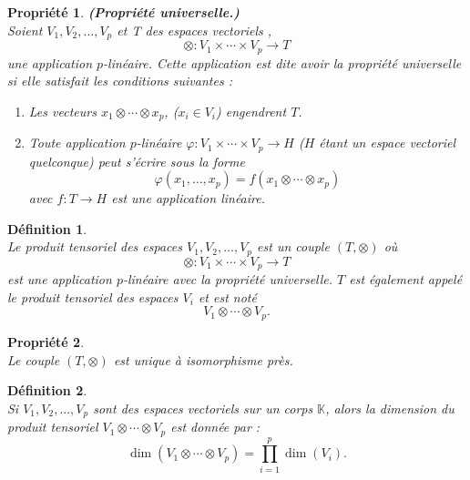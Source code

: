 \documentclass[a4paper, 14pt]{report}
\newtheorem{definition}{Définition}[section]
\newtheorem{propriety}{Propriété}[section]
\begin{document}
\begin{onehalfspace}
{			\begin{propriety}\textbf{(Propriété universelle.)} \cite{greub2012linear}\\
				Soient \( V_1, V_2, ... ,V_p \) et T des espaces vectoriels , 
				\[
				\otimes : V_1 \times \cdots \times V_p \to T
				\]
				une application \( p \)-linéaire. Cette application est dite avoir la \textit{propriété universelle} si elle satisfait les conditions suivantes :
				\begin{enumerate} [label=\roman*)]
					\item Les vecteurs \( x_1 \otimes \cdots \otimes x_p \), (\( x_i \in V_i \)) engendrent \( T \).
					\item Toute application \( p \)-linéaire \( \varphi : V_1 \times \cdots \times V_p \to H \) (\( H \) étant un espace vectoriel quelconque) peut s'écrire sous la forme
					\[
					\varphi(x_1, \ldots, x_p) = f(x_1 \otimes \cdots \otimes x_p)
					\]
					avec \( f : T \to H \) est une application linéaire.
				\end{enumerate}
			\end{propriety}
			
			\begin{definition} \cite{greub2012linear}\\
				Le produit tensoriel des espaces \( V_1, V_2, ... ,V_p \) est un couple \( (T, \otimes) \) où
				\[
				\otimes : V_1 \times \cdots \times V_p \to T
				\]
				est une application \( p \)-linéaire avec la propriété universelle. \( T \) est également appelé le produit tensoriel des espaces \( V_i \) et est noté
				\[
				V_1 \otimes \cdots \otimes V_p.
				\]
			\end{definition}
			
			\begin{propriety} \cite{greub2012linear}\\
Le couple \( (T, \otimes) \) est unique à isomorphisme près.
			\end{propriety}
			
			
			\begin{definition} \cite{greub2012linear}\\
				Si \( V_1, V_2, ... ,V_p \) sont des espaces vectoriels sur un corps \( \mathbb{K} \), alors la dimension du produit tensoriel \( V_1 \otimes \cdots \otimes V_p \) est donnée par :
				\[
				\dim(V_1 \otimes \cdots \otimes V_p) = \prod_{i=1}^p \dim(V_i).
				\]
			\end{definition}
			
			
			
}
\end{onehalfspace}
\end{document}
